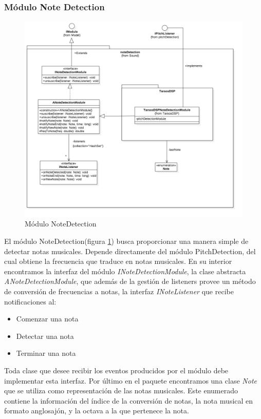 \subsubsection{Módulo Note Detection}
\begin{figure}
	\centering
	\includegraphics[width=1\linewidth]{imagenes/diagramas/NoteDetectionModule.png}
	\caption{Módulo NoteDetection}
	\label{fig:note-detection-module}
\end{figure}
El módulo NoteDetection(figura \ref{fig:note-detection-module}) busca proporcionar una manera simple de detectar notas musicales. Depende directamente del módulo PitchDetection, del cual obtiene la frecuencia que traduce en notas musicales.
En su interior encontramos la interfaz del módulo \textit{INoteDetectionModule}, la clase abstracta \textit{ANoteDetectionModule}, que además de la gestión de listeners provee un método de conversión de frecuencias a notas, la interfaz \textit{INoteListener} que recibe notificaciones al:
\begin{itemize}
	\item Comenzar una nota
	\item Detectar una nota
	\item Terminar una nota
\end{itemize}
 Toda clase que desee recibir los eventos producidos por el módulo debe implementar esta interfaz.
 Por último en el paquete encontramos una clase \textit{Note} que se utiliza como representación de las notas musicales. Este enumerado contiene la información del índice de la conversión de notas, la nota musical en formato anglosajón, y la octava a la que pertenece la nota.
 
